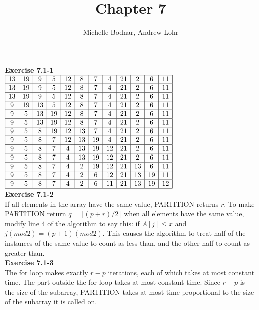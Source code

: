 \documentclass{article}
\title{Chapter 7}
\author{Michelle Bodnar, Andrew Lohr}
\begin{document}
\maketitle

\noindent\textbf{Exercise 7.1-1}\\
$
\begin{array}{|c|c|c|c|c|c|c|c|c|c|c|c|}
\hline
13&19&9&5&12&8&7&4&21&2&6&11\\
\hline
13&19&9&5&12&8&7&4&21&2&6&11\\
\hline
13&19&9&5&12&8&7&4&21&2&6&11\\
\hline
9&19&13&5&12&8&7&4&21&2&6&11\\
\hline
9&5&13&19&12&8&7&4&21&2&6&11\\
\hline
9&5&13&19&12&8&7&4&21&2&6&11\\
\hline
9&5&8&19&12&13&7&4&21&2&6&11\\
\hline
9&5&8&7&12&13&19&4&21&2&6&11\\
\hline
9&5&8&7&4&13&19&12&21&2&6&11\\
\hline
9&5&8&7&4&13&19&12&21&2&6&11\\
\hline
9&5&8&7&4&2&19&12&21&13&6&11\\
\hline
9&5&8&7&4&2&6&12&21&13&19&11\\
\hline
9&5&8&7&4&2&6&11&21&13&19&12\\
\hline
\end{array}
$
\\


\noindent\textbf{Exercise 7.1-2}\\

If all elements in the array have the same value, PARTITION returns $r$.  To make PARTITION return $q = \lfloor(p+r)/2\rfloor$ when all elements have the same value, modify line 4 of the algorithm to say this: if $A[j] \leq x$ and $j (mod 2) = (p+1) (mod 2)$.  This causes the algorithm to treat half of the instances of the same value to count as less than, and the other half to count as greater than. \\

\noindent\textbf{Exercise 7.1-3}\\

The for loop makes exactly $r-p$ iterations, each of which takes at most constant time. The part outside the for loop takes at most constant time. Since $r-p$ is the size of the subarray, PARTITION takes at most time proportional to the size of the subarray it is called on.\\
\end{document}
